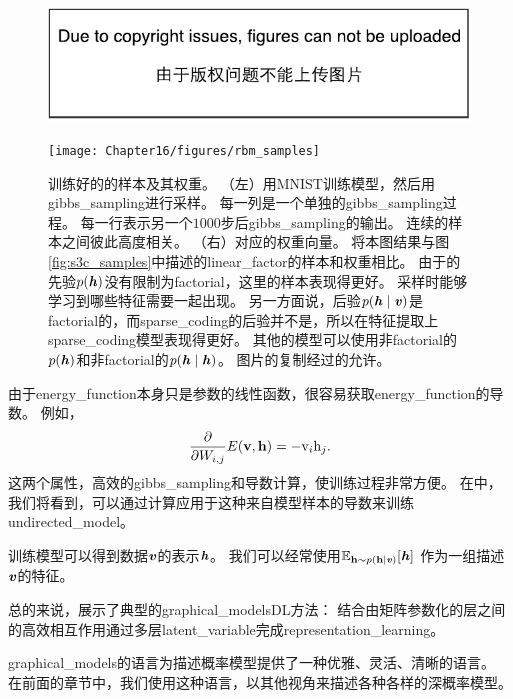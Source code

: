 \begin{figure}[!htb]
\ifOpenSource
\centerline{\includegraphics{figure.pdf}}
\else
	\centerline{\texttt{[image: Chapter16/figures/rbm\_samples]}}	
\fi
\caption{训练好的的样本及其权重。
（左）用MNIST训练模型，然后用\gls{gibbs_sampling}进行采样。
每一列是一个单独的\gls{gibbs_sampling}过程。
每一行表示另一个$1000$步后\gls{gibbs_sampling}的输出。
连续的样本之间彼此高度相关。
（右）对应的权重向量。
将本图结果与图\ref{fig:s3c_samples}中描述的\gls{linear_factor}的样本和权重相比。
由于的先验$p(\boldsymbol{\mathit{h}})$没有限制为\gls{factorial}，这里的样本表现得更好。
采样时能够学习到哪些特征需要一起出现。
另一方面说，后验$p(\boldsymbol{\mathit{h}} \mid \boldsymbol{\mathit{v}})$是\gls{factorial}的，而\gls{sparse_coding}的后验并不是，所以在特征提取上\gls{sparse_coding}模型表现得更好。
其他的模型可以使用非\gls{factorial}的$p(\boldsymbol{\mathit{h}})$和非\gls{factorial}的$p(\boldsymbol{\mathit{h}} \mid \boldsymbol{\mathit{h}})$。
图片的复制经过\citet{lisa_tutorial_rbm}的允许。}
\label{fig:rbm_sample}
\end{figure}


由于\gls{energy_function}本身只是参数的线性函数，很容易获取\gls{energy_function}的导数。 例如，
\begin{align}
\label{eqn:1615}
\frac{\partial}{\partial W_{i,j}} E(\mathbf{v},\mathbf{h}) = - \mathrm{v}_i \mathrm{h}_j.
\end{align}
这两个属性，高效的\gls{gibbs_sampling}和导数计算，使训练过程非常方便。
在中，我们将看到，可以通过计算应用于这种来自模型样本的导数来训练\gls{undirected_model}。

训练模型可以得到数据$\boldsymbol{\mathit{v}}$的表示$\boldsymbol{\mathit{h}}$。
我们可以经常使用$\mathbb{E}_{\mathbf{h}\sim p(\mathbf{h}\mid\boldsymbol{\mathit{v}})}[\boldsymbol{\mathit{h}}]$ 作为一组描述$\boldsymbol{\mathit{v}}$的特征。



总的来说，展示了典型的\gls{graphical_models}\gls{DL}方法：
结合由矩阵参数化的层之间的高效相互作用通过多层\gls{latent_variable}完成\gls{representation_learning}。


\gls{graphical_models}的语言为描述概率模型提供了一种优雅、灵活、清晰的语言。 
在前面的章节中，我们使用这种语言，以其他视角来描述各种各样的深概率模型。




